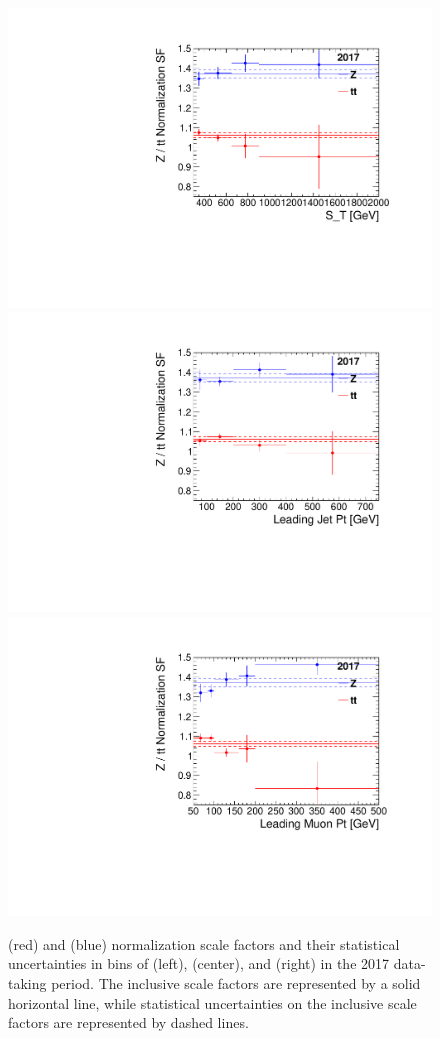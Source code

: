 \begin{figure}[H]
    \centering
    {\includegraphics[width=.4\textwidth]{Images/Analysis/SFStudy/mumuScaleFactors_ST_2017.pdf}}
    {\includegraphics[width=.4\textwidth]{Images/Analysis/SFStudy/mumuScaleFactors_jetPt_2017.pdf}}
    {\includegraphics[width=.4\textwidth]{Images/Analysis/SFStudy/mumuScaleFactors_muPt_2017.pdf}}
    \caption{\ZJETS (red) and \ttbar (blue) normalization scale factors and their statistical uncertainties in bins of \ST (left), \ptof{\PmuOne} (center), and \ptof{\jetOne} (right) in the 2017 data-taking period. The inclusive scale factors are represented by a solid horizontal line, while statistical uncertainties on the inclusive scale factors are represented by dashed lines.}
    \label{figapp:sfstudy_2017}
\end{figure}


